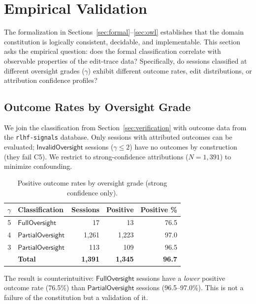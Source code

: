 \documentclass[11pt]{article}
\begin{document}
\section{Empirical Validation}
\label{sec:empirical}

The formalization in Sections~\ref{sec:formal}--\ref{sec:owl} establishes that the domain constitution is logically consistent, decidable, and implementable.
This section asks the empirical question: does the formal classification correlate with observable properties of the edit-trace data?
Specifically, do sessions classified at different oversight grades ($\gamma$) exhibit different outcome rates, edit distributions, or attribution confidence profiles?

\subsection{Outcome Rates by Oversight Grade}
\label{sec:outcome-by-grade}

We join the classification from Section~\ref{sec:verification} with outcome data from the \texttt{rlhf-signals} database.
Only sessions with attributed outcomes can be evaluated; $\mathsf{InvalidOversight}$ sessions ($\gamma \leq 2$) have no outcomes by construction (they fail C5).
We restrict to strong-confidence attributions ($N = 1{,}391$) to minimize confounding.

\begin{table}[ht]
\centering
\caption{Positive outcome rates by oversight grade (strong confidence only).}
\label{tab:outcome-by-grade}
\begin{tabular}{@{}clrrr@{}}
\toprule
$\gamma$ & \textbf{Classification} & \textbf{Sessions} & \textbf{Positive} & \textbf{Positive \%} \\
\midrule
5 & $\mathsf{FullOversight}$    & 17    & 13    & 76.5 \\
4 & $\mathsf{PartialOversight}$ & 1{,}261 & 1{,}223 & 97.0 \\
3 & $\mathsf{PartialOversight}$ & 113   & 109   & 96.5 \\
\midrule
  & \textbf{Total}              & \textbf{1{,}391} & \textbf{1{,}345} & \textbf{96.7} \\
\bottomrule
\end{tabular}
\end{table}

The result is counterintuitive: $\mathsf{FullOversight}$ sessions have a \emph{lower} positive outcome rate (76.5\%) than $\mathsf{PartialOversight}$ sessions (96.5--97.0\%).
This is not a failure of the constitution but a validation of it.
\end{document}
